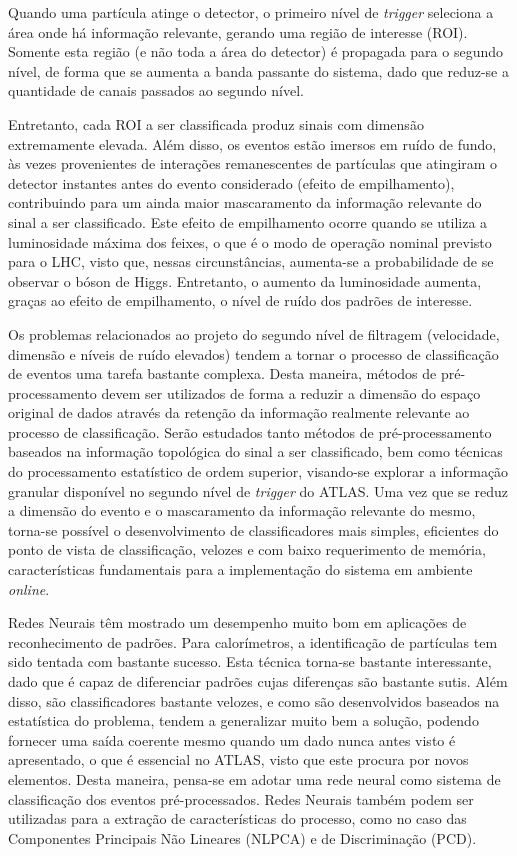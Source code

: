 Quando uma partícula atinge o detector, o primeiro nível de \emph{trigger} seleciona a área onde há informação relevante, gerando uma região de interesse (ROI). Somente esta região (e não toda a área do detector) é propagada para o segundo nível, de forma que se aumenta a banda passante do sistema, dado que reduz-se a quantidade de canais passados ao segundo
nível.

Entretanto, cada ROI a ser classificada produz sinais com dimensão extremamente elevada. Além disso, os eventos estão imersos em ruído de fundo, às vezes provenientes de interações remanescentes de partículas que atingiram o detector instantes antes do evento considerado (efeito de empilhamento), contribuindo para um ainda maior mascaramento da informação relevante do sinal a ser classificado. Este efeito de empilhamento ocorre quando se utiliza a luminosidade máxima dos feixes, o que é o modo de operação nominal previsto para o LHC, visto que, nessas circunstâncias, aumenta-se a probabilidade de se observar o bóson de Higgs. Entretanto, o aumento da luminosidade aumenta, graças ao efeito de empilhamento, o nível de ruído dos padrões de interesse.

Os problemas relacionados ao projeto do segundo nível de filtragem (velocidade, dimensão e níveis de ruído elevados) tendem a tornar o processo de classificação de eventos uma tarefa bastante complexa. Desta maneira, métodos de pré-processamento devem ser utilizados de forma a reduzir a dimensão do espaço original de dados através da retenção da informação realmente relevante ao processo de classificação. Serão estudados tanto métodos de pré-processamento baseados na informação topológica do sinal a ser classificado, bem como técnicas do processamento estatístico de ordem superior, visando-se explorar a informação granular disponível no segundo nível de \emph{trigger} do ATLAS. Uma vez que se reduz a dimensão do evento e o mascaramento da informação relevante do mesmo, torna-se possível o desenvolvimento de classificadores mais simples, eficientes do ponto de vista de classificação, velozes e com baixo requerimento de memória, características fundamentais para a implementação do sistema em ambiente \emph{online}.

Redes Neurais têm mostrado um desempenho muito bom em aplicações de reconhecimento de padrões. Para calorímetros, a identificação de partículas tem sido tentada com bastante sucesso. Esta técnica torna-se bastante interessante, dado que é capaz de diferenciar padrões cujas diferenças são bastante sutis. Além disso, são classificadores bastante velozes, e como são desenvolvidos baseados na estatística do problema, tendem a generalizar muito bem a solução, podendo fornecer uma saída coerente mesmo quando um dado nunca antes visto é apresentado, o que é essencial no ATLAS, visto que este procura por novos elementos. Desta maneira, pensa-se em adotar uma rede neural como sistema de classificação dos eventos pré-processados. Redes Neurais também podem ser utilizadas para a extração de características do processo, como no caso das Componentes Principais Não Lineares (NLPCA) e de Discriminação (PCD).

